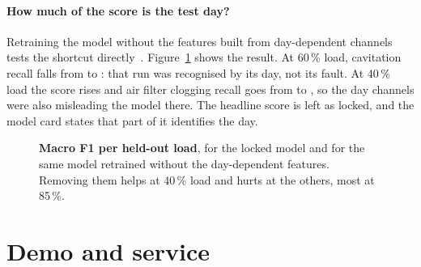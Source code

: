 \documentclass[10pt]{article}
\begin{document}
\paragraph{How much of the score is the test day?} Retraining the model without the \SensDropped{} features built from day-dependent channels tests the shortcut directly~\cite{geirhos2020shortcut}. Figure~\ref{fig:folds} shows the result. At 60\,\% load, cavitation recall falls from \SensCwBefore{} to \SensCwAfter: that run was recognised by its day, not its fault. At 40\,\% load the score rises and air filter clogging recall goes from \SensAfBefore{} to \SensAfAfter, so the day channels were also misleading the model there. The headline score is left as locked, and the model card states that part of it identifies the day.

\begin{figure}[!htbp]
\centering
{}
\caption{\textbf{Macro F1 per held-out load}, for the locked model and for the same model retrained without the \SensDropped{} day-dependent features. Removing them helps at 40\,\% load and hurts at the others, most at 85\,\%.}
\label{fig:folds}
\end{figure}

\section{Demo and service}
\label{sec:demo}
\end{document}
